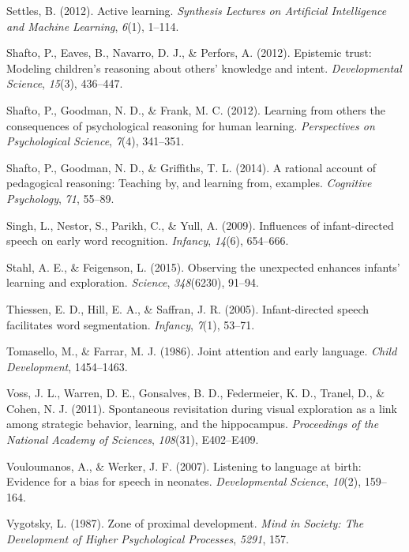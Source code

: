 \documentclass[a4paper,man,apacite,floatsintext]{apa6}
\begin{document}
\hypertarget{ref-settles2012active}{}
Settles, B. (2012). Active learning. \emph{Synthesis Lectures on
Artificial Intelligence and Machine Learning}, \emph{6}(1), 1--114.

\hypertarget{ref-shafto2012epistemic}{}
Shafto, P., Eaves, B., Navarro, D. J., \& Perfors, A. (2012). Epistemic
trust: Modeling children's reasoning about others' knowledge and intent.
\emph{Developmental Science}, \emph{15}(3), 436--447.

\hypertarget{ref-shafto2012learning}{}
Shafto, P., Goodman, N. D., \& Frank, M. C. (2012). Learning from others
the consequences of psychological reasoning for human learning.
\emph{Perspectives on Psychological Science}, \emph{7}(4), 341--351.

\hypertarget{ref-shafto2014rational}{}
Shafto, P., Goodman, N. D., \& Griffiths, T. L. (2014). A rational
account of pedagogical reasoning: Teaching by, and learning from,
examples. \emph{Cognitive Psychology}, \emph{71}, 55--89.

\hypertarget{ref-singh2009influences}{}
Singh, L., Nestor, S., Parikh, C., \& Yull, A. (2009). Influences of
infant-directed speech on early word recognition. \emph{Infancy},
\emph{14}(6), 654--666.

\hypertarget{ref-stahl2015observing}{}
Stahl, A. E., \& Feigenson, L. (2015). Observing the unexpected enhances
infants' learning and exploration. \emph{Science}, \emph{348}(6230),
91--94.

\hypertarget{ref-thiessen2005infant}{}
Thiessen, E. D., Hill, E. A., \& Saffran, J. R. (2005). Infant-directed
speech facilitates word segmentation. \emph{Infancy}, \emph{7}(1),
53--71.

\hypertarget{ref-tomasello1986joint}{}
Tomasello, M., \& Farrar, M. J. (1986). Joint attention and early
language. \emph{Child Development}, 1454--1463.

\hypertarget{ref-voss2011spontaneous}{}
Voss, J. L., Warren, D. E., Gonsalves, B. D., Federmeier, K. D., Tranel,
D., \& Cohen, N. J. (2011). Spontaneous revisitation during visual
exploration as a link among strategic behavior, learning, and the
hippocampus. \emph{Proceedings of the National Academy of Sciences},
\emph{108}(31), E402--E409.

\hypertarget{ref-vouloumanos2007listening}{}
Vouloumanos, A., \& Werker, J. F. (2007). Listening to language at
birth: Evidence for a bias for speech in neonates. \emph{Developmental
Science}, \emph{10}(2), 159--164.

\hypertarget{ref-vygotsky1987zone}{}
Vygotsky, L. (1987). Zone of proximal development. \emph{Mind in
Society: The Development of Higher Psychological Processes},
\emph{5291}, 157.
\end{document}
